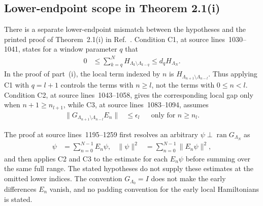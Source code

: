 \documentclass{article}
\begin{document}
\subsection{Lower-endpoint scope in Theorem 2.1(i)}

There is a separate lower-endpoint mismatch between the hypotheses and the
printed proof of Theorem~2.1(i) in
Ref.~\cite{Nachtergaele1996Spectral}. Condition C1, at source
lines~1030--1041, states for a window parameter $q$ that
\begin{align}
    0
     & \leq
    \sum_{k=q}^{N}H_{\Lambda_k\setminus\Lambda_{k-q}}
    \leq d_q H_{\Lambda_N}.
    \label{eq:cpgsv21_martingale_overlap_nachtergaele_c1_lower_endpoint}
\end{align}
In the proof of part~(i), the local term indexed by $n$ is
$H_{\Lambda_{n+1}\setminus\Lambda_{n-l}}$. Thus applying C1 with
$q=l+1$ controls the terms with $n\geq l$, not the terms with $0\leq n<l$.
Condition C2, at source lines~1043--1058, gives the corresponding local gap
only when $n+1\geq n_{l+1}$, while C3, at source lines~1083--1094,
assumes
\begin{align}
    \lVert G_{\Lambda_{n+1}\setminus\Lambda_{n-l}}E_n\rVert
     & \leq\epsilon_l
     &                & \text{only for }n\geq n_l.
    \label{eq:cpgsv21_martingale_overlap_nachtergaele_c3_lower_endpoint}
\end{align}

The proof at source lines~1195--1259 first resolves an arbitrary
$\psi\perp\operatorname{ran}G_{\Lambda_N}$ as
\begin{align}
    \psi
     & =\sum_{n=0}^{N-1}E_n\psi,
     &
    \lVert\psi\rVert^2
     & =\sum_{n=0}^{N-1}\lVert E_n\psi\rVert^2,
    \label{eq:cpgsv21_martingale_overlap_nachtergaele_full_resolution}
\end{align}
and then applies C2 and C3 to the estimate for each $E_n\psi$ before summing
over the same full range. The stated hypotheses do not supply these estimates
at the omitted lower indices. The convention $G_{\Lambda_0}=I$ does not make
the early differences $E_n$ vanish, and no padding convention for the early
local Hamiltonians is stated.
\end{document}
